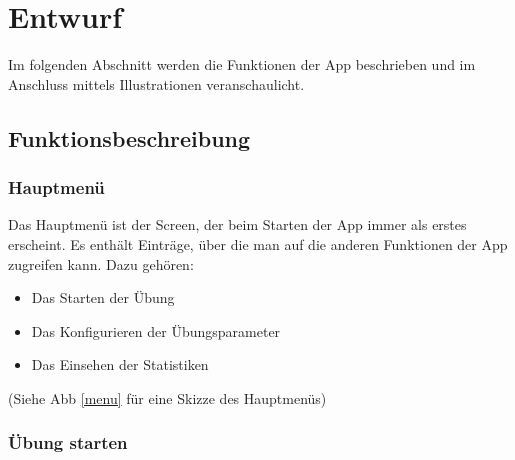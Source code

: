 \section{Entwurf}
Im folgenden Abschnitt werden die Funktionen der App beschrieben und im Anschluss mittels Illustrationen veranschaulicht.

\subsection{Funktionsbeschreibung}
\subsubsection{Hauptmenü}

Das Hauptmenü ist der Screen, der beim Starten der App immer als erstes erscheint.
Es enthält Einträge, über die man auf die anderen Funktionen der App zugreifen kann.
Dazu gehören:
\begin{itemize}[itemsep=0pt]
  \item Das Starten der Übung
  \item Das Konfigurieren der Übungsparameter
  \item Das Einsehen der Statistiken
\end{itemize}

\noindent (Siehe Abb \ref{menu} für eine Skizze des Hauptmenüs)

\subsubsection{Übung starten}

